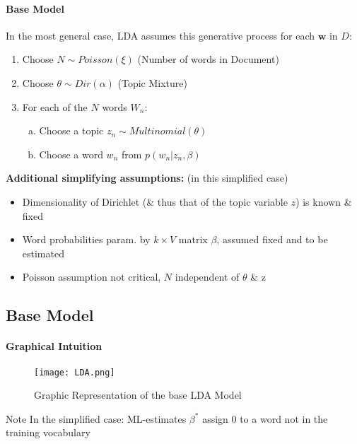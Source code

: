 \documentclass[aspectratio=169]{beamer}
\begin{document}
\begin{frame}{\insertsectionhead}   
\framesubtitle{Base Model}
  
 In the most general case, LDA assumes this generative process for each $\textbf{w}$ in $D$:
  \begin{enumerate}
    \item Choose $N \sim Poisson(\xi)$ (Number of words in Document)
    \item Choose $\theta \sim  Dir(\alpha)$ (Topic Mixture)
    \item For each of the $N$ words $W_n$:
    \begin{enumerate}[(a)]
      \item Choose a topic $z_n \sim Multinomial(\theta)$ 
      \item Choose a word $w_n$ from $p(w_n| z_n, \beta) $
    \end{enumerate}
  \end{enumerate}  
  \textbf{Additional simplifying assumptions:} (in this simplified case)
  \begin{itemize}
    \item Dimensionality of Dirichlet (\& thus that of the topic variable $z$) is known \& fixed 
    \item Word probabilities param. by $k \times V$ matrix $\beta$, assumed fixed and to be estimated
    \item Poisson assumption not critical, $N$ independent of $\theta$ \& z
  \end{itemize} 
\end{frame}

\subsection{Base Model}
\begin{frame}{\insertsubsectionhead}
  \framesubtitle{Graphical Intuition}
  \begin{figure}
    \begin{center}
      \texttt{[image: LDA.png]}
    \end{center}
    \caption{Graphic Representation of the base LDA Model \cite{LDA}}
  \end{figure}
  \begin{exampleblock}{Note}
    In the simplified case: ML-estimates $\beta^*$ assign 0 to a word not in the training vocabulary
  \end{exampleblock}
\end{frame}
\end{document}
